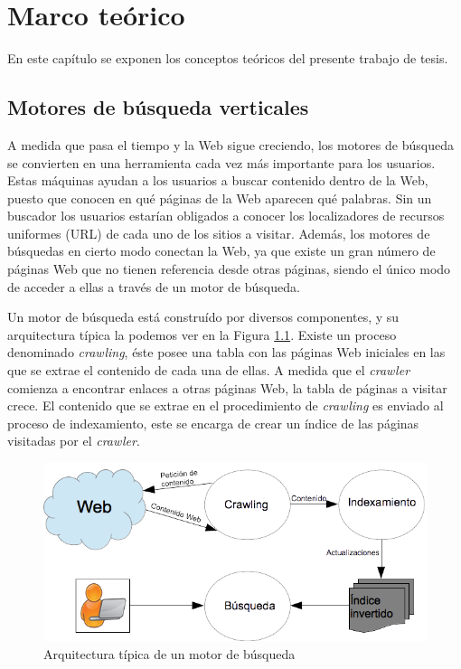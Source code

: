 \chapter{Marco te\'orico}
\label{cap:marco}

En este capítulo se exponen los conceptos teóricos del presente trabajo de tesis. 


\section{Motores de búsqueda verticales}
\label{marco:mbv}
A medida que pasa el tiempo y la Web sigue creciendo, los motores de búsqueda se convierten en una herramienta cada vez más importante para los usuarios. Estas máquinas ayudan a los usuarios a buscar contenido dentro de la Web, puesto que conocen en qué páginas de la Web aparecen qué palabras. Sin un buscador los usuarios estarían obligados a conocer los localizadores de recursos uniformes (URL) de cada uno de los sitios a visitar. Además, los motores de búsquedas en cierto modo conectan la Web, ya que existe un gran número de páginas Web que no tienen referencia desde otras páginas, siendo el único modo de acceder a ellas a través de un motor de búsqueda.

Un motor de búsqueda está construído por diversos componentes, y su arquitectura típica la podemos ver en la Figura \ref{fig:searchenginearchitecture}. Existe un proceso denominado \textit{crawling}, éste posee una tabla con las páginas Web iniciales en las que se extrae el contenido de cada una de ellas. A medida que el \textit{crawler} comienza a encontrar enlaces a otras páginas Web, la tabla de páginas a visitar crece. El contenido que se extrae en el procedimiento de \textit{crawling} es enviado al proceso de indexamiento, este se encarga de crear un índice de las páginas visitadas por el \textit{crawler}. 

\begin{figure}[tp]
\centering
\includegraphics[scale=.75]{images/searchenginearchitecture.png}
\caption{Arquitectura típica de un motor de búsqueda}
\label{fig:searchenginearchitecture}
\end{figure}


